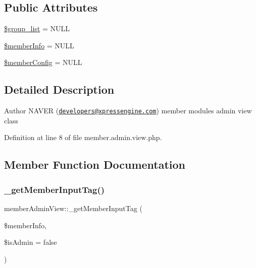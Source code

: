 \subsection*{Public Attributes}
\begin{DoxyCompactItemize}
\item 
\hyperlink{classmemberAdminView_a900a93ad7807c2f056b5055cf33f6be6}{\$group\+\_\+list} = N\+U\+LL
\item 
\hyperlink{classmemberAdminView_a4955a7b9bc128c344a2987dd1cb8e043}{\$member\+Info} = N\+U\+LL
\item 
\hyperlink{classmemberAdminView_acd19132e0c8fd313edebad04734206f9}{\$member\+Config} = N\+U\+LL
\end{DoxyCompactItemize}


\subsection{Detailed Description}
\begin{DoxyAuthor}{Author}
N\+A\+V\+ER (\href{mailto:developers@xpressengine.com}{\tt developers@xpressengine.\+com}) member module\textquotesingle{}s admin view class 
\end{DoxyAuthor}


Definition at line 8 of file member.\+admin.\+view.\+php.



\subsection{Member Function Documentation}
\hypertarget{classmemberAdminView_a49f5bc2cf86576c040abfb686c21383b}{}\label{classmemberAdminView_a49f5bc2cf86576c040abfb686c21383b} 
\subsubsection{\texorpdfstring{\+\_\+get\+Member\+Input\+Tag()}{\_getMemberInputTag()}}
{\footnotesize\ttfamily member\+Admin\+View\+::\+\_\+get\+Member\+Input\+Tag (\begin{DoxyParamCaption}\item[{}]{\$member\+Info,  }\item[{}]{\$is\+Admin = {\ttfamily false} }\end{DoxyParamCaption})}

